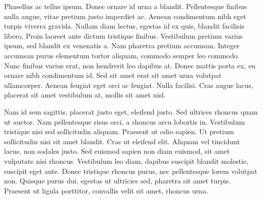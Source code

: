 Phasellus ac tellus ipsum. Donec ornare id urna a blandit. Pellentesque finibus nulla augue, vitae pretium justo imperdiet ac. Aenean condimentum nibh eget turpis viverra gravida. Nullam diam lectus, egestas id ex quis, blandit facilisis libero. Proin laoreet ante dictum tristique finibus. Vestibulum pretium varius ipsum, sed blandit ex venenatis a. Nam pharetra pretium accumsan. Integer accumsan purus elementum tortor aliquam, commodo semper leo commodo. Nunc finibus varius erat, non hendrerit leo dapibus at. Donec mattis porta ex, eu ornare nibh condimentum id. Sed sit amet erat sit amet urna volutpat ullamcorper. Aenean feugiat eget orci ac feugiat. Nulla facilisi. Cras augue lacus, placerat sit amet vestibulum at, mollis sit amet nisl.%

Nam id sem sagittis, placerat justo eget, eleifend justo. Sed ultrices rhoncus quam ut auctor. Nam pellentesque risus orci, a rhoncus arcu lobortis in. Vestibulum tristique nisi sed sollicitudin aliquam. Praesent ut odio sapien. Ut pretium sollicitudin nisi sit amet blandit. Cras ut eleifend elit. Aliquam vel tincidunt lacus, non sodales justo. Sed euismod sapien non diam euismod, sit amet vulputate nisi rhoncus. Vestibulum leo diam, dapibus suscipit blandit molestie, suscipit eget ante. Donec tristique rhoncus purus, nec pellentesque lorem volutpat non. Quisque purus dui, egestas ut ultricies sed, pharetra sit amet turpis. Praesent ut ligula porttitor, convallis velit sit amet, rhoncus urna. 

